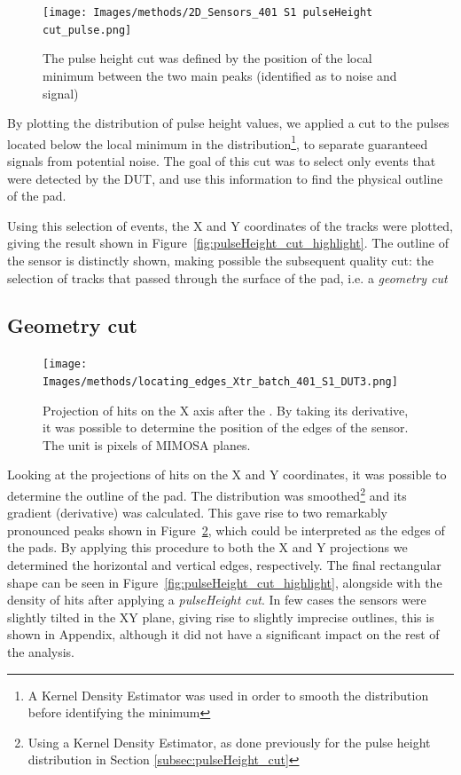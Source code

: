 \begin{figure}[h!tbp]
    \centering
    \texttt{[image: Images/methods/2D\_Sensors\_401 S1 pulseHeight cut\_pulse.png]}
    \captionsetup{width=\captionwidth}
    \caption{The pulse height cut was defined by the position of the local minimum between the two main peaks (identified as to noise and signal)}
    \label{fig:pulseHeight_cut}
\end{figure}

By plotting the distribution of pulse height values, we applied a cut to the pulses located below the local minimum in the distribution\footnote{A Kernel Density Estimator was used in order to smooth the distribution before identifying the minimum}, to separate guaranteed signals from potential noise. The goal of this cut was to select only events that were detected by the DUT, and use this information to find the physical outline of the pad.

Using this selection of events, the X and Y coordinates of the tracks were plotted, giving the result shown in Figure~\ref{fig:pulseHeight_cut_highlight}. The outline of the sensor is distinctly shown, making possible the subsequent quality cut: the selection of tracks that passed through the surface of the pad, i.e. a \textit{geometry cut}

\subsection{Geometry cut}\label{sec:geometry_cut}

\begin{figure}[h!tbp]
    \centering
    \texttt{[image: Images/methods/locating\_edges\_Xtr\_batch\_401\_S1\_DUT3.png]}
    \captionsetup{width=\captionwidth}
    \caption{Projection of hits on the X axis after the . By taking its derivative, it was possible to determine the position of the edges of the sensor. The unit is pixels of MIMOSA planes.}
    \label{fig:edges_of_the_sensor}
\end{figure}

Looking at the projections of hits on the X and Y coordinates, it was possible to determine the outline of the pad. The distribution was smoothed\footnote{Using a Kernel Density Estimator, as done previously for the pulse height distribution in Section \ref{subsec:pulseHeight_cut}} and its gradient (derivative) was calculated. This gave rise to two remarkably pronounced peaks shown in Figure~\ref{fig:edges_of_the_sensor}, which could be interpreted as the edges of the pads. By applying this procedure to both the X and Y projections we determined the horizontal and vertical edges, respectively. The final rectangular shape can be seen in Figure~\ref{fig:pulseHeight_cut_highlight}, alongside with the density of hits after applying a \textit{pulseHeight cut}. In few cases the sensors were slightly tilted in the XY plane, giving rise to slightly imprecise outlines, this is shown in Appendix, although it did not have a significant impact on the rest of the analysis.

